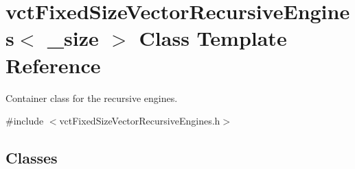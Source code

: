 \hypertarget{classvct_fixed_size_vector_recursive_engines}{\section{vct\-Fixed\-Size\-Vector\-Recursive\-Engines$<$ \-\_\-size $>$ Class Template Reference}
\label{classvct_fixed_size_vector_recursive_engines}
}


Container class for the recursive engines.  




{\ttfamily \#include $<$vct\-Fixed\-Size\-Vector\-Recursive\-Engines.\-h$>$}

\subsection*{Classes}
